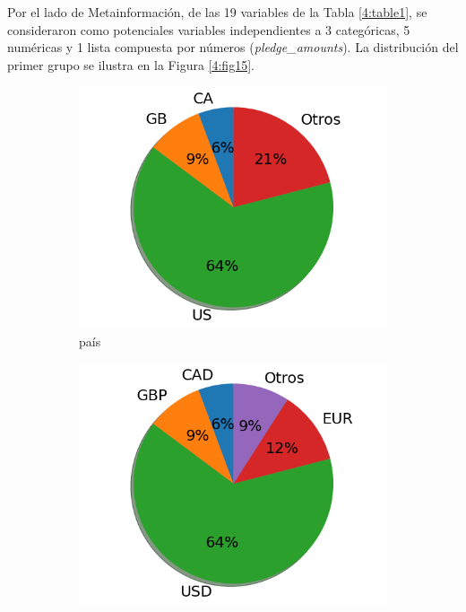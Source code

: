 Por el lado de Metainformación, de las 19 variables de la Tabla \ref{4:table1}, se consideraron como potenciales variables independientes a 3 categóricas, 5 numéricas y 1 lista compuesta por números (\textit{pledge\_amounts}). La distribución del primer grupo se ilustra en la Figura \ref{4:fig15}.

\begin{figure}[!ht]
	\centering
	\small
	\begin{subfigure}{.35\textwidth}
		\centering
		\includegraphics[width=1.13\linewidth]{4/figures/country_distribution.png}
		\caption{país}
	\end{subfigure}%
	\begin{subfigure}{.36\textwidth}
		\centering
		\includegraphics[width=1.13\linewidth]{4/figures/currency_distribution.png}

\end{subfigure}
\end{figure}
